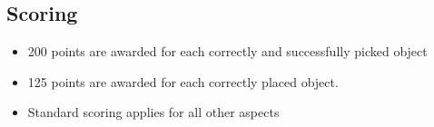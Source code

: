 \subsection{Scoring}
\begin{itemize}
	\item 200 points are awarded for each correctly and successfully picked object
	\item 125 points are awarded for each correctly placed object.
	\item Standard scoring applies for all other aspects
\end{itemize}
